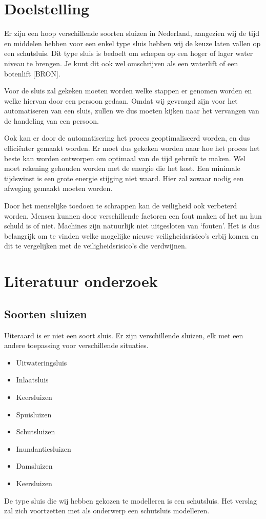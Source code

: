 \documentclass{article}
\begin{document}
\clearpage %
\section{Doelstelling}
Er zijn een hoop verschillende soorten sluizen in Nederland, aangezien wij de tijd en middelen hebben voor een enkel type sluis hebben wij de keuze laten vallen op een schutsluis. Dit type sluis is bedoelt om schepen op een hoger of lager water niveau te brengen. Je kunt dit ook wel omschrijven als een waterlift of een botenlift [BRON].

Voor de sluis zal gekeken moeten worden welke stappen er genomen worden en welke hiervan door een persoon gedaan. Omdat wij gevraagd zijn voor het automatiseren van een sluis, zullen we dus moeten kijken naar het vervangen van de handeling van een persoon.

Ook kan er door de automatisering het proces geoptimaliseerd worden, en dus efficiënter gemaakt worden. Er moet dus gekeken worden naar hoe het proces het beste kan worden ontworpen om optimaal van de tijd gebruik te maken. Wel moet rekening gehouden worden met de energie die het kost. Een minimale tijdswinst is een grote energie stijging niet waard. Hier zal zowaar nodig een afweging gemaakt moeten worden.

Door het menselijke toedoen te schrappen kan de veiligheid ook verbeterd worden. Mensen kunnen door verschillende factoren een fout maken of het nu hun schuld is of niet. Machines zijn natuurlijk niet uitgesloten van ‘fouten’. Het is dus belangrijk om te vinden welke mogelijke nieuwe veiligheidsrisico’s erbij komen en dit te vergelijken met de veiligheidsrisico’s die verdwijnen.


\clearpage %
\section{Literatuur onderzoek} %

\subsection{Soorten sluizen}
Uiteraard is er niet een soort sluis. Er zijn verschillende sluizen, elk met een andere toepassing voor verschillende situaties.
\begin{itemize}
\item Uitwateringsluis
\item Inlaatsluis
\item Keersluizen
\item Spuisluizen
\item Schutsluizen
\item Inundantiesluizen
\item Damsluizen
\item Keersluizen
\end{itemize}
De type sluis die wij hebben gekozen te modelleren is een schutsluis. Het verslag zal zich voortzetten met als onderwerp een schutsluis modelleren.
\end{document}
